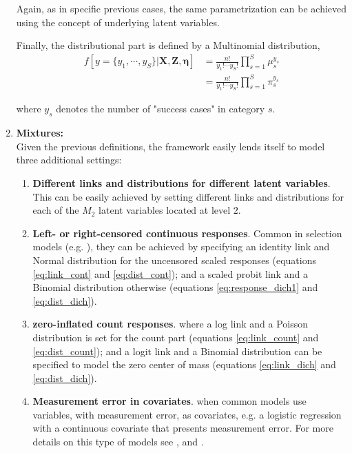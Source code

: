 \begin{enumerate}
{	Again, as in specific previous cases, the same parametrization can be achieved using the concept of underlying latent variables.
	
	Finally, the distributional part is defined by a Multinomial distribution,
	\begin{equation} \label{eq:dist_rank}
		\begin{split}
			f[y=\{y_{1}, \cdots, y_{S}\} | \mathbf{X}, \mathbf{Z}, \pmb{\eta}] &= \frac{n!}{y_{1}! \cdots y_{S}!} \prod_{s=1}^{S} \mu_{s}^{y_{s}} \\
			&= \frac{n!}{y_{1}! \cdots y_{S}!} \prod_{s=1}^{S} \pi_{s}^{y_{s}}
		\end{split}
	\end{equation}
	
	where $y_{s}$ denotes the number of "success cases" in category $s$.
	}


		
	\item \textbf{Mixtures:} \\
	Given the previous definitions, the framework easily lends itself to model three additional settings:
	
	\begin{enumerate}
		\item \textbf{Different links and distributions for different latent variables}. This can be easily achieved by setting different links and distributions for each of the $M_{2}$ latent variables located at level $2$.
		
		
		\item \textbf{Left- or right-censored continuous responses}. Common in selection models (e.g. \citealp{Hekman_1979}), they can be achieved by specifying an identity link and Normal distribution for the uncensored scaled responses (equations \ref{eq:link_cont} and \ref{eq:dist_cont}); and a scaled probit link and a Binomial distribution otherwise (equations \ref{eq:response_dich1} and \ref{eq:dist_dich}).
		
		
		\item \textbf{zero-inflated count responses}. where a log link and a Poisson distribution is set for the count part (equations \ref{eq:link_count} and \ref{eq:dist_count}); and a logit link and a Binomial distribution can be specified to model the zero center of mass (equations \ref{eq:link_dich} and \ref{eq:dist_dich}).
		
		
		\item \textbf{Measurement error in covariates}. when common models use variables, with measurement error, as covariates, e.g. a logistic regression with a continuous covariate that presents measurement error. For more details on this type of models see \citet{Rabe_et_al_2003a, Rabe_et_al_2003b}, and \citet{Skrondal_et_al_2003b}.
		

\end{enumerate}
\end{enumerate}
